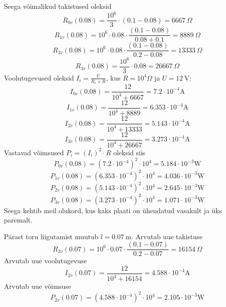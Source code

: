Seega võimalikud takistused oleksid
\[R_{0v}(0.08) = \frac{10^6}{3} \cdot (0.1-0.08) = \SI{6667}{\Omega}\]
\[R_{1v}(0.08) = 10^6 \cdot  0.08 \cdot \frac{(0.1-0.08)}{0.08+0.1} = \SI{8889}{\Omega}\]
\[R_{2v}(0.08) = 10^6 \cdot  0.08 \cdot  \frac{(0.1-0.08)}{0.2-0.08} = \SI{13333}{\Omega}\]
\[R_{3v}(0.08) = \frac{10^6}{3} \cdot 0.08 = \SI{26667}{\Omega}\]
Voolutugevused oleksid $I_i=\frac{U}{R_i  + R}$, kus $R = 10^4\si{\Omega}$ ja $U = \SI{12}{\volt}$:
\[ I_{0v}(0.08) = \frac{12}{10^4 + 6667} = 7.2 \cdot 10^{-4} \si{\ampere}\]
\[ I_{1v}(0.08) = \frac{12}{10^4 + 8889} = 6.353 \cdot 10^{-4} \si{\ampere}\]
\[ I_{2v}(0.08) = \frac{12}{10^4 + 13333} = 5.143 \cdot 10^{-4} \si{\ampere}\]
\[ I_{3v}(0.08) = \frac{12}{10^4 + 26667} = 3.273 \cdot 10^{-4} \si{\ampere}\]
Vastavad võimsused $P_i = (I_i)^2 \cdot R$ oleksid siis
\[ P_{0v}(0.08) = (7.2 \cdot 10^{-4})^2 \cdot 10^4 = 5.184 \cdot 10^{-3}  \si{\watt}\]
\[ P_{1v}(0.08) = (6.353 \cdot 10^{-4})^2 \cdot 10^4 = 4.036 \cdot 10^{-3}  \si{\watt}\]
\[ P_{2v}(0.08) = (5.143 \cdot 10^{-4})^2 \cdot 10^4 = 2.645 \cdot 10^{-3}  \si{\watt}\]
\[ P_{3v}(0.08) = (3.273 \cdot 10^{-4})^2 \cdot 10^4 = 1.071 \cdot 10^{-3}  \si{\watt}\]
Seega kehtib meil olukord, kus kaks plaati on ühendatud vasakult ja üks paremalt.

Pärast toru liigutamist muutub $l=\SI{0.07}{\meter} $.
Arvutab uue takistuse
\[ R_{2v}(0.07) =  10^6 \cdot 0.07 \cdot  \frac{(0.1-0.07)}{0.2-0.07} = \SI{16154}{\Omega} \]
Arvutab uue voolutugevuse
\[ I_{2v}(0.07) = \frac{12}{10^4 + 16154} = 4.588 \cdot 10^{-4} \si{\ampere}\]
Arvutab  uue võimsuse
\[ P_{2v}(0.07) = (4.588 \cdot 10^{-4})^2 \cdot 10^4 = 2.105 \cdot 10^{-3}  \si{\watt}\]
\probend